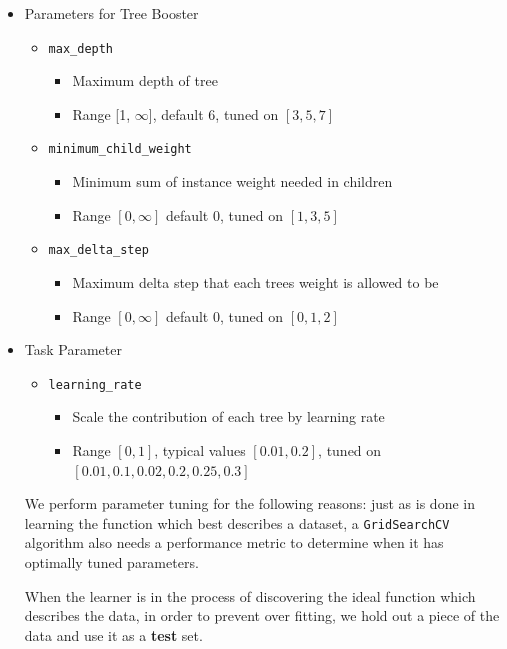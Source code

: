 \documentclass[twoside,openright,titlepage,numbers=noenddot,headinclude,%
               footinclude=true,cleardoublepage=empty,abstractoff,BCOR=5mm,%
               paper=a4,fontsize=11pt,ngerman,american]{scrreprt}
\numberwithin{theorem}{chapter}
\numberwithin{definition}{chapter}
\numberwithin{algorithm}{chapter}
\numberwithin{figure}{chapter}
\numberwithin{table}{chapter}
\numberwithin{equation}{chapter}
\begin{document}
\begin{itemize}
\item Parameters for Tree Booster
    \begin{itemize}
        \item \texttt{max\_depth}
        \begin{itemize}
            \item Maximum depth of tree
            \item Range [1, $\infty$], default 6, tuned on $[3,5,7]$
        \end{itemize}
        \item \texttt{minimum\_child\_weight}
        \begin{itemize}
            \item Minimum sum of instance weight needed in children
            \item Range $[0,\infty]$ default 0, tuned on $[1,3,5]$
        \end{itemize}
        \item \texttt{max\_delta\_step}
        \begin{itemize}
            \item Maximum delta step that each trees weight is allowed to be
            \item Range $[0, \infty]$ default 0, tuned on $[0, 1, 2]$
        \end{itemize}
    \end{itemize}

\item Task Parameter
    \begin{itemize}
        \item \texttt{learning\_rate}
        \begin{itemize}
            \item Scale the contribution of each tree by learning rate
            \item Range $[0, 1]$, typical values $[0.01, 0.2]$, tuned on $[0.01, 0.1, 0.02, 0.2, 0.25, 0.3]$
        \end{itemize}
    \end{itemize} 

We perform parameter tuning for the following reasons: just as is done in learning the function which best describes a dataset, a \texttt{GridSearchCV} algorithm also needs a performance metric to determine when it has optimally tuned parameters. 

When the learner is in the process of discovering the ideal function which describes the data, in order to prevent over fitting, we hold out a piece of the data and use it as a \textbf{test} set. 


\end{itemize}
\end{document}
